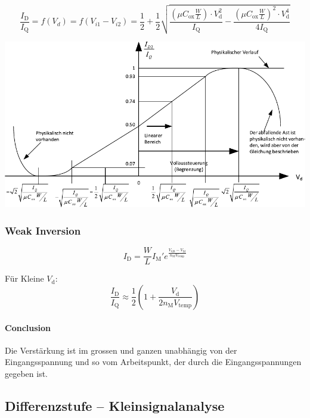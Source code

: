 \[
    \frac{I_\text{D}}{I_\text{Q}} = f(V_d) = f(V_{i1} - V_{i2}) = \frac{1}{2} + \frac{1}{2} \sqrt{\frac{\left(\mu C_\text{ox} \frac{W}{L}\right) \cdot V_\text{d}^2}{I_\text{Q}} - \frac{\left(\mu C_\text{ox} \frac{W}{L}\right)^2 \cdot V_\text{d}^4}{4 I_\text{Q}}}
\]


\includegraphics[width=\columnwidth, align=t]{images/09_differenzstufe_grosssignalanalyse_strong_inv.pdf}


\subsubsection{Weak Inversion}
\[
    I_\text{D} = \frac{W}{L} I_\text{M}' e^\frac{V_\text{GS}-V_\text{M}}{n_\text{M} V_\text{temp}}
\]


Für Kleine $V_\text{d}$:
\[
    \frac{I_\text{D}}{I_\text{Q}} \approx \frac{1}{2} \left(1+\frac{V_\text{d}}{2 n_\text{M} V_\text{temp}}\right)
\]


\paragraph{Conclusion}
Die Verstärkung ist im grossen und ganzen unabhängig von der Eingangsspannung und so vom Arbeitspunkt, der durch die Eingangsspannungen gegeben ist.

\subsection{Differenzstufe -- Kleinsignalanalyse}

